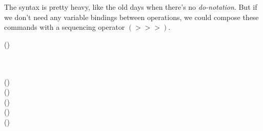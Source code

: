 The syntax is pretty heavy, like the old days when there's no
 \emph{do-notation}\cite{history}. But if we don't need any variable bindings
 between operations, we could compose these commands with a sequencing operator
 \ensuremath{(\mathbin{>>>})}.

\begin{hscode}\SaveRestoreHook
{}%
%
\>[B]{}(\mathbin{>>>})\mathbin{::}\;\Rightarrow {}\;\;\;\to {}\;\;\;\to {}\;\;\;\<[E]%
\ColumnHook
\end{hscode}\resethooks
\begin{hscode}\SaveRestoreHook
{}%
%
%
%
%
\>[B]{}\mathrel{=}\<[E]%
\\
\>[B]{}\<[5]%
\>[5]{}\mathbin{>>>}\;{}\<[E]%
\\
\>[5]{}\<[13]%
\>[13]{}(\mathbin{::}\;)\;{}\<[E]%
\\
\>[5]{}\<[13]%
\>[13]{}(\mathbin{::}\;){}\<[E]%
\\
\>[B]{}\<[5]%
\>[5]{}\mathbin{>>>}\;{}\<[17]%
\>[17]{}(\mathbin{::}\;){}\<[E]%
\\
\>[B]{}\<[5]%
\>[5]{}\mathbin{>>>}\;{}\<[17]%
\>[17]{}(\mathbin{::}\;)\;\<[E]%
\\
\>[B]{}\<[5]%
\>[5]{}\mathbin{>>>}\;{}\<[17]%
\>[17]{}(\mathbin{::}\;){}\<[E]%
\ColumnHook
\end{hscode}\resethooks
